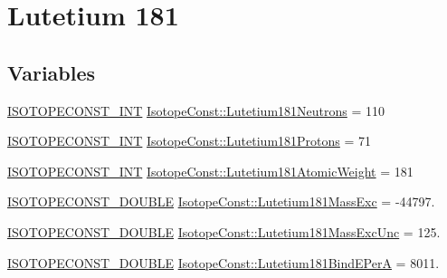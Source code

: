\hypertarget{group___isotope_const-_lutetium-_lu181}{}\section{Lutetium 181}
\label{group___isotope_const-_lutetium-_lu181}
\subsection*{Variables}
\begin{DoxyCompactItemize}
\item 
\mbox{\hyperlink{group___isotope_const-_macros_ga5f18360b3e99483a35c32d789e62621c}{I\+S\+O\+T\+O\+P\+E\+C\+O\+N\+S\+T\+\_\+\+I\+NT}} \mbox{\hyperlink{group___isotope_const-_lutetium-_lu181_ga13e719364552a25001319f75ef50c9e8}{Isotope\+Const\+::\+Lutetium181\+Neutrons}} = 110
\item 
\mbox{\hyperlink{group___isotope_const-_macros_ga5f18360b3e99483a35c32d789e62621c}{I\+S\+O\+T\+O\+P\+E\+C\+O\+N\+S\+T\+\_\+\+I\+NT}} \mbox{\hyperlink{group___isotope_const-_lutetium-_lu181_gaf7781df50eef035540c7e0ad4e85c56b}{Isotope\+Const\+::\+Lutetium181\+Protons}} = 71
\item 
\mbox{\hyperlink{group___isotope_const-_macros_ga5f18360b3e99483a35c32d789e62621c}{I\+S\+O\+T\+O\+P\+E\+C\+O\+N\+S\+T\+\_\+\+I\+NT}} \mbox{\hyperlink{group___isotope_const-_lutetium-_lu181_ga4c459370c58f2922b1e13055a3ff6adf}{Isotope\+Const\+::\+Lutetium181\+Atomic\+Weight}} = 181
\item 
\mbox{\hyperlink{group___isotope_const-_macros_ga8f45a7272ce02c0b4c65c44636ed719a}{I\+S\+O\+T\+O\+P\+E\+C\+O\+N\+S\+T\+\_\+\+D\+O\+U\+B\+LE}} \mbox{\hyperlink{group___isotope_const-_lutetium-_lu181_gab1d18028cc75a83f79531e4caed5ea64}{Isotope\+Const\+::\+Lutetium181\+Mass\+Exc}} = -\/44797.
\item 
\mbox{\hyperlink{group___isotope_const-_macros_ga8f45a7272ce02c0b4c65c44636ed719a}{I\+S\+O\+T\+O\+P\+E\+C\+O\+N\+S\+T\+\_\+\+D\+O\+U\+B\+LE}} \mbox{\hyperlink{group___isotope_const-_lutetium-_lu181_ga0017c4df663d45c066b662f43bcd0f92}{Isotope\+Const\+::\+Lutetium181\+Mass\+Exc\+Unc}} = 125.
\item 
\mbox{\hyperlink{group___isotope_const-_macros_ga8f45a7272ce02c0b4c65c44636ed719a}{I\+S\+O\+T\+O\+P\+E\+C\+O\+N\+S\+T\+\_\+\+D\+O\+U\+B\+LE}} \mbox{\hyperlink{group___isotope_const-_lutetium-_lu181_ga140d07f21441435ed06da9fed78c1aae}{Isotope\+Const\+::\+Lutetium181\+Bind\+E\+PerA}} = 8011.
\item 

\end{DoxyCompactItemize}
